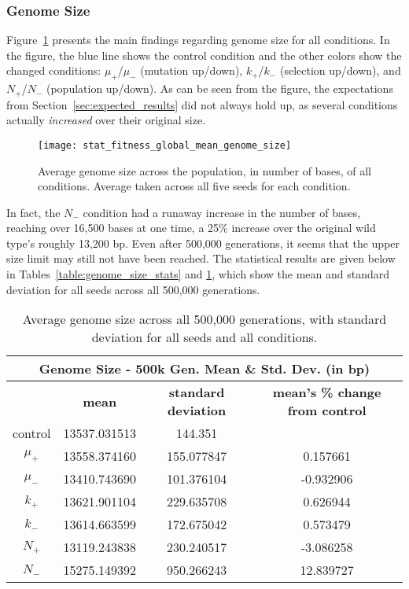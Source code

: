 \subsubsection{Genome Size}\label{sec:genome_size}

Figure~\ref{fig:genome_size} presents the main findings regarding genome size for all conditions. In the figure, the blue line shows the control condition and the other colors show the changed conditions: $\mu_+$/$\mu_-$ (mutation up/down), $k_+$/$k_-$ (selection up/down), and $N_+$/$N_-$ (population up/down). As can be seen from the figure, the expectations from Section~\ref{sec:expected_results} did not always hold up, as several conditions actually \textit{increased} over their original size. 
\begin{figure}[H]
	\centering
	\texttt{[image: stat\_fitness\_global\_mean\_genome\_size]}
	\caption[Genome size]{Average genome size across the population, in number of bases, of all conditions. Average taken across all five seeds for each condition.}
	\label{fig:genome_size}
\end{figure}
In fact, the $N_-$ condition had a runaway increase in the number of bases, reaching over 16,500 bases at one time, a 25\% increase over the original wild type's roughly 13,200 bp. Even after 500,000 generations, it seems that the upper size limit may still not have been reached. The statistical results are given below in Tables~\ref{table:genome_size_stats} and \ref{table:genome_size_mean_and_std_dev}, which show the mean and standard deviation for all seeds across all 500,000 generations. 

\begin{table}[H]
	\begin{tabular}{|c|c|c|c|}
		\hline
		\multicolumn{4}{c}{\Large \textbf{Genome Size - 500k Gen. Mean \& Std. Dev. (in bp)}} \\
		\hline
		 & \textbf{mean} & \textbf{standard deviation} & \textbf{mean's \% change from control} \\
		 \hline
		 control & 13537.031513 & 144.351 & \textemdash \\ 
		 \hline
		 $\mu_+$ & 13558.374160 & 155.077847 & 0.157661 \\ 
		 \hline
		 $\mu_-$ & 13410.743690 & 101.376104 & -0.932906 \\ 
		 \hline
		 $k_+$ & 13621.901104 & 229.635708 & 0.626944 \\ 
		 \hline
		 $k_-$ & 13614.663599 & 172.675042 & 0.573479 \\ 
		 \hline
		 $N_+$ & 13119.243838 & 230.240517 & -3.086258 \\ 
		 \hline
		 $N_-$ & 15275.149392 & 950.266243 & 12.839727 \\ 
		 \hline
	\end{tabular}
	\caption[Genome size - mean and std. dev.]{Average genome size across all 500,000 generations, with standard deviation for all seeds and all conditions. }
	\label{table:genome_size_mean_and_std_dev}
\end{table}

